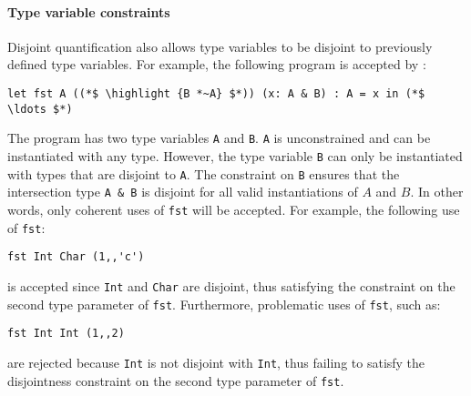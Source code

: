 \paragraph{Type variable constraints}
Disjoint quantification also allows type variables to be disjoint 
to previously defined type variables. For example, the following
program is accepted by \name:
\begin{lstlisting}
let fst A ((*$ \highlight {B *~A} $*)) (x: A & B) : A = x in (*$ \ldots $*)
\end{lstlisting}
The program has two type variables \lstinline{A} and \lstinline{B}. 
\lstinline{A} is unconstrained and can be instantiated with any type. 
However, the type variable \lstinline{B} can only be instantiated
with types that are disjoint to \lstinline{A}. 
The constraint on \lstinline{B} ensures that the
intersection type \lstinline{A & B} is disjoint for all valid instantiations of $A$ and $B$.
In other words, only coherent uses of \lstinline$fst$ will be accepted.
For example, the following use of \lstinline$fst$:
\begin{lstlisting}
fst Int Char (1,,'c')
\end{lstlisting}
is accepted since \lstinline$Int$ and \lstinline$Char$ are disjoint, thus satisfying the constraint
on the second type parameter of \lstinline$fst$.
Furthermore, problematic uses of \lstinline$fst$, such as:
\begin{lstlisting}
fst Int Int (1,,2)
\end{lstlisting}
\noindent are rejected because \lstinline$Int$ is not disjoint with \lstinline$Int$, thus failing to satisfy the
disjointness constraint on the second type parameter of \lstinline$fst$.

